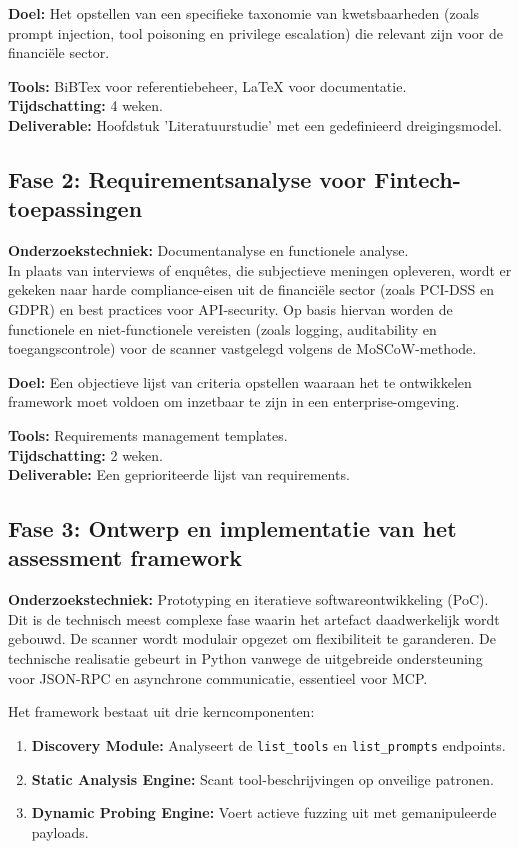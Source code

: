 \textbf{Doel:} Het opstellen van een specifieke taxonomie van kwetsbaarheden (zoals prompt injection, tool poisoning en privilege escalation) die relevant zijn voor de financiële sector. 

\textbf{Tools:} BiBTex voor referentiebeheer, LaTeX voor documentatie. \\
\textbf{Tijdschatting:} 4 weken. \\
\textbf{Deliverable:} Hoofdstuk 'Literatuurstudie' met een gedefinieerd dreigingsmodel.

\subsection{Fase 2: Requirementsanalyse voor Fintech-toepassingen}

\textbf{Onderzoekstechniek:} Documentanalyse en functionele analyse. \\
In plaats van interviews of enquêtes, die subjectieve meningen opleveren, wordt er gekeken naar harde compliance-eisen uit de financiële sector (zoals PCI-DSS en GDPR) en best practices voor API-security. Op basis hiervan worden de functionele en niet-functionele vereisten (zoals logging, auditability en toegangscontrole) voor de scanner vastgelegd volgens de MoSCoW-methode.

\textbf{Doel:} Een objectieve lijst van criteria opstellen waaraan het te ontwikkelen framework moet voldoen om inzetbaar te zijn in een enterprise-omgeving.

\textbf{Tools:} Requirements management templates. \\
\textbf{Tijdschatting:} 2 weken. \\
\textbf{Deliverable:} Een geprioriteerde lijst van requirements.

\subsection{Fase 3: Ontwerp en implementatie van het assessment framework}

\textbf{Onderzoekstechniek:} Prototyping en iteratieve softwareontwikkeling (PoC). \\
Dit is de technisch meest complexe fase waarin het artefact daadwerkelijk wordt gebouwd. De scanner wordt modulair opgezet om flexibiliteit te garanderen. De technische realisatie gebeurt in Python vanwege de uitgebreide ondersteuning voor JSON-RPC en asynchrone communicatie, essentieel voor MCP.

Het framework bestaat uit drie kerncomponenten:
\begin{enumerate}
    \item \textbf{Discovery Module:} Analyseert de \texttt{list\_tools} en \texttt{list\_prompts} endpoints.
    \item \textbf{Static Analysis Engine:} Scant tool-beschrijvingen op onveilige patronen.
    \item \textbf{Dynamic Probing Engine:} Voert actieve fuzzing uit met gemanipuleerde payloads.
\end{enumerate}

